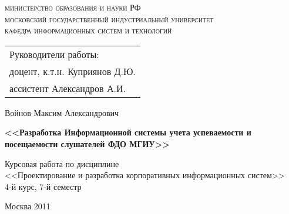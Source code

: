 \thispagestyle{empty}

\vspace*{-\headheight}\vspace*{-\headsep}

{\centering\textsc{ 
министерство образования и науки РФ\\
московский государственный индустриальный университет\\
кафедра информационных систем и технологий\\
}

\vspace{4cm plus 1mm minus 1mm}

\begin{flushright}
\begin{tabular}{l}
Руководители работы:\\
доцент, к.т.н. Куприянов Д.Ю.\\
ассистент Александров А.И.
\end{tabular}
\end{flushright}

\vspace{3cm plus 1mm minus 1mm}

Войнов Максим Александрович

\vspace{1cm plus 1mm minus 1mm}
{\large\textbf{
<<Разработка Информационной системы учета успеваемости и посещаемости слушателей ФДО МГИУ>>
}}

\vspace{1cm plus 1mm minus 1mm}

Курсовая работа по дисциплине\\
<<Проектирование и разработка корпоративных информационных систем>>\\
4-й курс, 7-й семестр

\vfill

Москва 2011

}

\newpage
\endinput

